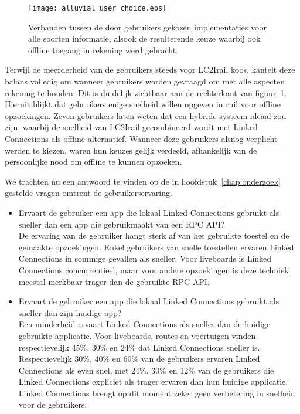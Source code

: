 \begin{figure}[ht]
	\centering
	\texttt{[image: alluvial\_user\_choice.eps]}
	\caption[Door gebruikers gekozen implementatie]{Verbanden tussen de door gebruikers gekozen implementaties voor alle soorten informatie, alsook de resulterende keuze waarbij ook offline toegang in rekening werd gebracht. }
	\label{fig:alluvialUserChoices}
\end{figure}

Terwijl de meerderheid van de gebruikers steeds voor LC2Irail koos, kantelt deze balans volledig om wanneer gebruikers worden gevraagd om met alle aspecten rekening te houden. Dit is duidelijk zichtbaar aan de rechterkant van figuur~\ref{fig:alluvialUserChoices}. Hieruit blijkt dat gebruikers enige snelheid willen opgeven in ruil voor offline opzoekingen. Zeven gebruikers laten weten dat een hybride systeem ideaal zou zijn, waarbij de snelheid van LC2Irail gecombineerd wordt met Linked Connections als offline alternatief. Wanneer deze gebruikers alsnog verplicht werden te kiezen, waren hun keuzes gelijk verdeeld, afhankelijk van de persoonlijke nood om offline te kunnen opzoeken. 

We trachten nu een antwoord te vinden op de in hoofdstuk~\ref{chap:onderzoek} gestelde vragen omtrent de gebruikerservaring.
\begin{itemize}
	\item Ervaart de gebruiker een app die lokaal Linked Connections gebruikt als sneller dan een app die gebruikmaakt van een RPC API?\\
	De ervaring van de gebruiker hangt sterk af van het gebruikte toestel en de gemaakte opzoekingen. Enkel gebruikers van snelle toestellen ervaren Linked Connections in sommige gevallen als sneller. Voor liveboards is Linked Connections concurrentieel, maar voor andere opzoekingen is deze techniek meestal merkbaar trager dan de gebruikte RPC API.
	\item Ervaart de gebruiker een app die lokaal Linked Connections gebruikt als sneller dan zijn huidige app?\\
	Een minderheid ervaart Linked Connections als sneller dan de huidige gebruikte applicatie. Voor liveboards, routes en voertuigen vinden respectievelijk 45\%, 30\% en 24\% dat Linked Connections sneller is. Respectievelijk 30\%, 40\% en 60\% van de gebruikers ervaren Linked Connections als even snel, met 24\%, 30\% en 12\% van de gebruikers die Linked Connections expliciet als trager ervaren dan hun huidige applicatie. Linked Connections brengt op dit moment zeker geen verbetering in snelheid voor de gebruikers.
\end{itemize}

